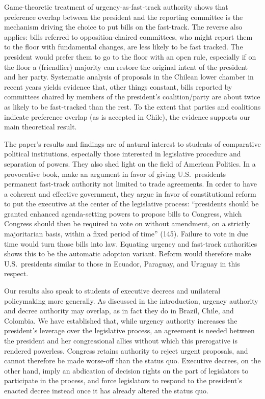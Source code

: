 \documentclass[letter,12pt]{article}
\begin{document}
Game-theoretic treatment of urgency-as-fast-track authority shows that preference overlap between the president and the reporting committee is the mechanism driving the choice to put bills on the fast-track. The reverse also applies: bills referred to opposition-chaired committees, who might report them to the floor with fundamental changes, are less likely to be fast tracked. The president would prefer them to go to the floor with an open rule, especially if on the floor a (friendlier) majority can restore the original intent of the president and her party. Systematic analysis of proposals in the Chilean lower chamber in recent years yields evidence that, other things constant, bills reported by committees chaired by members of the president's coalition/party are about twice as likely to be fast-tracked than the rest. To the extent that parties and coalitions indicate preference overlap (as is accepted in Chile), the evidence supports our main theoretical result.

The paper's results and findings are of natural interest to students of comparative political institutions, especially those interested in legislative procedure and separation of powers. They also shed light on the field of American Politics. In a provocative book, \citet{howell.moe.Relic2016} make an argument in favor of giving U.S.\ presidents permanent fast-track authority not limited to trade agreements. In order to have a coherent and effective government, they argue in favor of constitutional reform to put the executive at the center of the legislative process: ``presidents should be granted enhanced agenda-setting powers to propose bills to Congress, which Congress should then be required to vote on without amendment, on a strictly majoritarian basis, within a fixed period of time'' (145). Failure to vote in due time would turn those bills into law. Equating urgency and fast-track authorities shows this to be the automatic adoption variant. Reform would therefore make U.S.\ presidents similar to those in Ecuador, Paraguay, and Uruguay in this respect. 

Our results also speak to students of executive decrees and unilateral policymaking more generally. As discussed in the introduction, urgency authority and decree authority may overlap, as in fact they do in Brazil, Chile, and Colombia. We have established that, while urgency authority increases the president's leverage over the legislative process, an agreement is needed between the president and her congressional allies without which this prerogative is rendered powerless. Congress retains authority to reject urgent proposals, and cannot therefore be made worse-off than the status quo. Executive decrees, on the other hand, imply an abdication of decision rights on the part of legislators to participate in the process, and force legislators to respond to the president's enacted decree instead once it has already altered the status quo.
\end{document}
